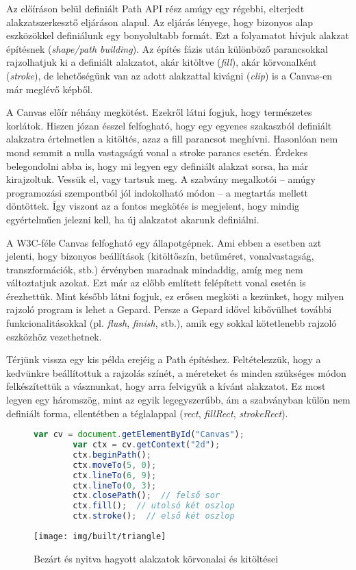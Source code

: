 \documentclass[12pt]{report}
\theoremstyle{definition}
\newcommand{\inenglish}[1]{\textsl{#1}}
\begin{document}
Az előíráson belül definiált Path API rész amúgy egy régebbi, elterjedt
alakzatszerkesztő eljáráson alapul. Az eljárás lényege, hogy bizonyos alap
eszközökkel definiálunk egy bonyolultabb formát. Ezt a folyamatot hívjuk
alakzat építésnek (\inenglish{shape/path building}). Az építés fázis után
különböző parancsokkal rajzolhatjuk ki a definiált alakzatot, akár kitöltve
(\emph{fill}), akár körvonalként (\emph{stroke}), de lehetőségünk van az adott
alakzattal kivágni (\emph{clip}) is a Canvas-en már meglévő képből.

A Canvas előír néhány megkötést. Ezekről látni fogjuk, hogy természetes
korlátok. Hiszen józan ésszel felfogható, hogy egy egyenes szakaszból definiált
alakzatra értelmetlen a kitöltés, azaz a fill parancsot meghívni. Hasonlóan nem
mond semmit a nulla vastagságú vonal a stroke parancs esetén. Érdekes
belegondolni abba is, hogy mi legyen egy definiált alakzat sorsa, ha már
kirajzoltuk. Vessük el, vagy tartsuk meg. A szabvány megalkotói -- amúgy
programozási szempontból jól indokolható módon -- a megtartás mellett
döntöttek. Így viszont az a fontos megkötés is megjelent, hogy mindig
egyértelműen jelezni kell, ha új alakzatot akarunk definiálni.

A W3C-féle Canvas felfogható egy állapotgépnek. Ami ebben a esetben azt
jelenti, hogy bizonyos beállítások (kitöltőszín, betűméret, vonalvastagság,
transzformációk, stb.) érvényben maradnak mindaddig, amíg meg nem változtatjuk
azokat. Ezt már az előbb említett felépített vonal esetén is érezhettük. Mint
később látni fogjuk, ez erősen megköti a kezünket, hogy milyen rajzoló program
is lehet a Gepard. Persze a Gepard idővel kibővülhet további
funkcionalitásokkal (pl. \emph{flush}, \emph{finish}, stb.), amik egy sokkal
kötetlenebb rajzoló eszközhöz vezethetnek.

Térjünk vissza egy kis példa erejéig a Path építéshez. Feltételezzük, hogy a
kedvünkre beállítottuk a rajzolás színét, a méreteket és minden szükséges módon
felkészítettük a vásznunkat, hogy arra felvigyük a kívánt alakzatot. Ez most
legyen egy háromszög, mint az egyik legegyszerűbb, ám a szabványban külön nem
definiált forma, ellentétben a téglalappal (\emph{rect}, \emph{fillRect},
\emph{strokeRect}).

  \begin{figure}[!htb]
    \hspace{0.1\textwidth}
      \centering
      \begin{lstlisting}[language=JavaScript, autogobble=true]
        var cv = document.getElementById("Canvas");
        var ctx = cv.getContext("2d");
        ctx.beginPath();
        ctx.moveTo(5, 0);
        ctx.lineTo(6, 9);
        ctx.lineTo(0, 3);
        ctx.closePath();  // felső sor
        ctx.fill();  // utolsó két oszlop
        ctx.stroke();  // első két oszlop
      \end{lstlisting}
    \endminipage
    \hfill
      \texttt{[image: img/built/triangle]}
    \endminipage
    \caption{\label{triangles-code-and-image} Bezárt és nyitva hagyott
    alakzatok körvonalai és kitöltései }
  \end{figure}
\end{document}
